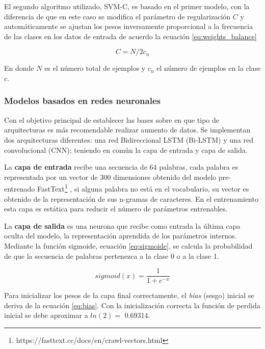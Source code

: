  El segundo algoritmo utilizado, SVM-C,  es basado en el primer modelo, con la diferencia de que en este caso se modifica el parámetro de regularización $C$ y automáticamente se ajustan los pesos inversamente proporcional a la frecuencia de las clases en los datos de entrada de acuerdo la ecuación \ref{eq:weights_balance}
 
 \begin{equation}
 \label{eq:weights_balance}
     C = N/2c_n
 \end{equation}
 
 En donde $N$ es el número total de ejemplos y $c_n$ el número de ejemplos en la clase $c$.  

\subsubsection{Modelos basados en redes neuronales}

Con el objetivo principal de establecer las bases sobre en que tipo de arquitecturas es más recomendable realizar aumento de datos. Se implementan dos arquitecturas diferentes: una red Bidireccional LSTM (Bi-LSTM) y una red convolucional (CNN); teniendo en común la capa de entrada y capa de salida.

La \textbf{capa de entrada} recibe una secuencia de 64 palabras, cada palabra es representada por un vector de 300 dimensiones obtenido del modelo pre-entrenado FastText\footnote{https://fasttext.cc/docs/en/crawl-vectors.html} , si alguna palabra no está en el vocabulario, su vector es obtenido de la representación de sus n-gramas de caracteres. En el entrenamiento esta capa es estática para reducir el número de parámetros entrenables.

La \textbf{capa de salida} es una neurona que recibe como entrada la última capa oculta del modelo, la representación aprendida de los parámetros internos. Mediante la función sigmoide, ecuación \ref{eq:sigmoide}, se calcula la probabilidad de que la secuencia de palabras pertenezca a la clase 0 o a la clase 1.

\begin{equation}
    \label{eq:sigmoide}
    sigmoid(x) = \frac{1}{1+ e^{-x}}
\end{equation}

Para inicializar los pesos de la capa final correctamente, el \textit{bias} (sesgo) inicial se deriva de la ecuación \ref{eq:bias}.  Con la inicialización correcta la función de perdida inicial se debe aproximar a $ln(2)=$ 0.69314. 

